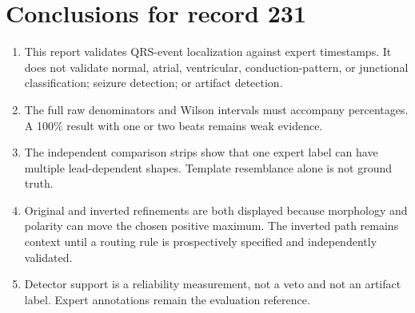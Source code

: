 \documentclass[11pt]{article}
\begin{document}
        \clearpage
        \section{Conclusions for record 231}
        \begin{enumerate}
        \item This report validates QRS-event localization against expert timestamps. It does not validate
        normal, atrial, ventricular, conduction-pattern, or junctional classification;
        seizure detection; or artifact detection.
        \item The full raw denominators and Wilson intervals must accompany percentages. A 100\% result with
        one or two beats remains weak evidence.
        \item The independent comparison strips show that one expert label can have multiple lead-dependent
        shapes. Template resemblance alone is not ground truth.
        \item Original and inverted refinements are both displayed because morphology and polarity can move the
        chosen positive maximum. The inverted path remains context until a routing rule is prospectively specified
        and independently validated.
        \item Detector support is a reliability measurement, not a veto and not an artifact label. Expert
        annotations remain the evaluation reference.
        \end{enumerate}

        
        
        
\end{document}

